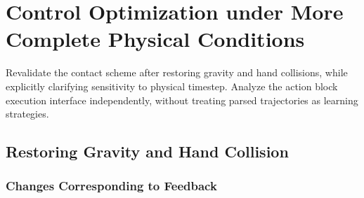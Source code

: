 \chapter{Control Optimization under More Complete Physical Conditions}

Revalidate the contact scheme after restoring gravity and hand collisions, while explicitly clarifying sensitivity to physical timestep. Analyze the action block execution interface independently, without treating parsed trajectories as learning strategies.

\section{Restoring Gravity and Hand Collision}

\label{stage:s13}

\subsection{Changes Corresponding to Feedback}\label{s13-detail-1}

